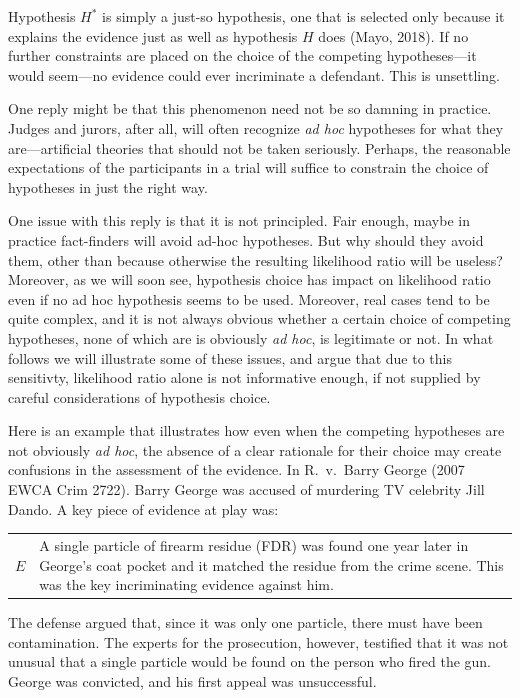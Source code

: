 \documentclass[
  10pt,
  dvipsnames,enabledeprecatedfontcommands]{scrartcl}
\begin{document}
Hypothesis \(H^*\) is simply a just-so hypothesis, one that is selected
only because it explains the evidence just as well as hypothesis \(H\)
does (Mayo, 2018). If no further constraints are placed on the choice of
the competing hypotheses---it would seem---no evidence could ever
incriminate a defendant. This is unsettling.

One reply might be that this phenomenon need not be so damning in
practice. Judges and jurors, after all, will often recognize
\textit{ad hoc} hypotheses for what they are---artificial theories that
should not be taken seriously. Perhaps, the reasonable expectations of
the participants in a trial will suffice to constrain the choice of
hypotheses in just the right way.

One issue with this reply is that it is not principled. Fair enough,
maybe in practice fact-finders will avoid ad-hoc hypotheses. But why
should they avoid them, other than because otherwise the resulting
likelihood ratio will be useless? Moreover, as we will soon see,
hypothesis choice has impact on likelihood ratio even if no ad hoc
hypothesis seems to be used. Moreover, real cases tend to be quite
complex, and it is not always obvious whether a certain choice of
competing hypotheses, none of which are is obviously \textit{ad hoc}, is
legitimate or not. In what follows we will illustrate some of these
issues, and argue that due to this sensitivty, likelihood ratio alone is
not informative enough, if not supplied by careful considerations of
hypothesis choice.

Here is an example that illustrates how even when the competing
hypotheses are not obviously \textit{ad hoc}, the absence of a clear
rationale for their choice may create confusions in the assessment of
the evidence. In R.~v.~Barry George (2007 EWCA Crim 2722). Barry George
was accused of murdering TV celebrity Jill Dando. A key piece of
evidence at play was: \vspace{2mm}

\begin{center}
\begin{tabular}{lp{12cm}} 
    $E$ &  
    A single particle of firearm  residue (FDR) 
     was found one year later in George's coat pocket and it matched the residue from the crime scene.
     This was the key incriminating evidence against him. 
\end{tabular}
\end{center}
\vspace{2mm}

\noindent  The defense argued that, since it was only one particle,
there must have been contamination. The experts for the prosecution,
however, testified that it was not unusual that a single particle would
be found on the person who fired the gun. George was convicted, and his
first appeal was unsuccessful.
\end{document}
